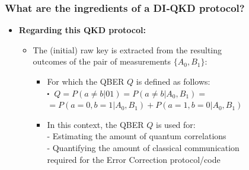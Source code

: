 \documentclass{beamer}
\newcommand\sbullet[1][.5]{\mathbin{\vcenter{\hbox{\scalebox{#1}{$\bullet$}}}}}
\begin{document}
    \begin{frame}
        \frametitle{\large What are the ingredients of a DI‑QKD protocol?}

        \begin{itemize}
            \item \textbf{Regarding this QKD protocol:}
            \begin{itemize}
                \item The (initial) raw key is extracted from the resulting\\ outcomes of the pair of measurements $\{{A}_{0}, {B}_{1}\}$:
                \begin{itemize}
                    \item For which the QBER $Q$ is defined as follows:\\
                    $\sbullet$\, $Q = P(a \neq b | 01) = P(a \neq b | {A}_{0}, {B}_{1}) =$\\
                    \hspace{1.4em}$= P(a = 0, b = 1 | {A}_{0}, {B}_{1}) + P(a = 1, b = 0 | {A}_{0}, {B}_{1})$\\
                    \vspace{1ex}
                    \item In this context, the QBER $Q$ is used for:\\
                    \footnotesize
                    - Estimating the amount of quantum correlations\\
                    - Quantifying the amount of classical communication\\\hspace{0.5em}required for the Error Correction protocol/code
                \end{itemize}
            \end{itemize}
        \end{itemize}
    \end{frame}
\end{document}
